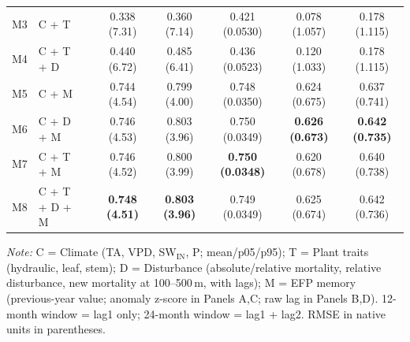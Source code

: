 \begin{table}[htbp]
\begin{tabular}{llcccccc}
M3 & C + T &  & 0.338 (7.31) & 0.360 (7.14) & 0.421 (0.0530) & 0.078 (1.057) & 0.178 (1.115) \\
M4 & C + T + D &  & 0.440 (6.72) & 0.485 (6.41) & 0.436 (0.0523) & 0.120 (1.033) & 0.178 (1.115) \\
M5 & C + M &  & 0.744 (4.54) & 0.799 (4.00) & 0.748 (0.0350) & 0.624 (0.675) & 0.637 (0.741) \\
M6 & C + D + M &  & 0.746 (4.53) & 0.803 (3.96) & 0.750 (0.0349) & \textbf{0.626 (0.673)} & \textbf{0.642 (0.735)} \\
M7 & C + T + M &  & 0.746 (4.52) & 0.800 (3.99) & \textbf{0.750 (0.0348)} & 0.620 (0.678) & 0.640 (0.738) \\
M8 & C + T + D + M &  & \textbf{0.748 (4.51)} & \textbf{0.803 (3.96)} & 0.749 (0.0349) & 0.625 (0.674) & 0.642 (0.736) \\
\midrule
\bottomrule
\end{tabular}
\vspace{2pt}
\begin{minipage}{\linewidth}
\footnotesize
\textit{Note:} C = Climate (TA, VPD, SW$_\mathrm{IN}$, P; mean/p05/p95); T = Plant traits (hydraulic, leaf, stem); D = Disturbance (absolute/relative mortality, relative disturbance, new mortality at 100--500\,m, with lags); M = EFP memory (previous-year value; anomaly z-score in Panels A,C; raw lag in Panels B,D). 12-month window = lag1 only; 24-month window = lag1 + lag2. RMSE in native units in parentheses.
\end{minipage}
\end{table}

